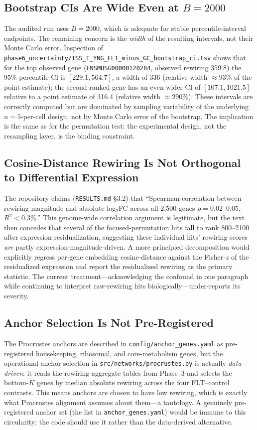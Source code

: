 \documentclass[11pt]{article}
\newcommand{\code}[1]{\texttt{#1}}
\begin{document}
\subsection{Bootstrap CIs Are Wide Even at $B=2000$}
The audited run uses $B{=}2000$, which is adequate for stable percentile-interval endpoints. The remaining concern is the \emph{width} of the resulting intervals, not their Monte Carlo error. Inspection of \code{phase6\_uncertainty/ISS\_T\_YNG\_FLT\_minus\_GC\_bootstrap\_ci.tsv} shows that for the top observed gene (\code{ENSMUSG00000120284}, observed rewiring 359.8) the 95\% percentile CI is $[229.1, 564.7]$, a width of 336 (relative width $\approx 93\%$ of the point estimate); the second-ranked gene has an even wider CI of $[107.1, 1021.5]$ relative to a point estimate of 316.4 (relative width $\approx 290\%$). These intervals are correctly computed but are dominated by sampling variability of the underlying $n{=}5$-per-cell design, not by Monte Carlo error of the bootstrap. The implication is the same as for the permutation test: the experimental design, not the resampling layer, is the binding constraint.

\subsection{Cosine-Distance Rewiring Is Not Orthogonal to Differential Expression}
The repository claims (\code{RESULTS.md} \S 3.2) that ``Spearman correlation between rewiring magnitude and absolute log$_2$FC across all 2,500 genes $\rho = 0.02\text{--}0.05$, $R^2 < 0.3\%$.'' This genome-wide correlation argument is legitimate, but the text then concedes that several of the focused-permutation hits fall to rank 800--2100 after expression-residualization, suggesting these individual hits' rewiring scores \emph{are} partly expression-magnitude-driven. A more principled decomposition would explicitly regress per-gene embedding cosine-distance against the Fisher-$z$ of the residualized expression and report the residualized rewiring as the primary statistic. The current treatment---acknowledging the confound in one paragraph while continuing to interpret raw-rewiring hits biologically---under-reports its severity.

\subsection{Anchor Selection Is Not Pre-Registered}
The Procrustes anchors are described in \code{config/anchor\_genes.yaml} as pre-registered housekeeping, ribosomal, and core-metabolism genes, but the operational anchor selection in \code{src/networks/procrustes.py} is actually \emph{data-driven}: it reads the rewiring-aggregate tables from Phase~3 and selects the bottom-$K$ genes by median absolute rewiring across the four FLT--control contrasts. This means anchors are chosen to have low rewiring, which is exactly what Procrustes alignment assumes about them---a tautology. A genuinely pre-registered anchor set (the list in \code{anchor\_genes.yaml}) would be immune to this circularity; the code should use it rather than the data-derived alternative.
\end{document}
